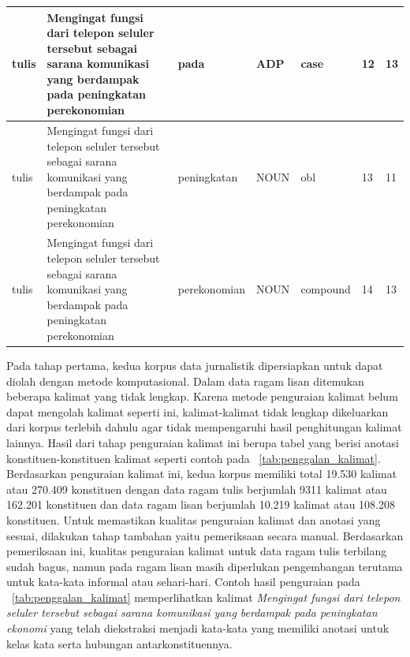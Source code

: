 \begin{center}
\begin{table}
\begin{tiny}
\begin{tabulary}{1\textwidth}{| L | L | L | L | L | L | L |}
tulis & Mengingat fungsi dari telepon seluler tersebut sebagai sarana komunikasi yang berdampak pada peningkatan perekonomian & pada & ADP & case & 12 & 13 \\ \hline
tulis & Mengingat fungsi dari telepon seluler tersebut sebagai sarana komunikasi yang berdampak pada peningkatan perekonomian & peningkatan & NOUN & obl & 13 & 11 \\ \hline
tulis & Mengingat fungsi dari telepon seluler tersebut sebagai sarana komunikasi yang berdampak pada peningkatan perekonomian & perekonomian & NOUN & compound & 14 & 13 \\ 
\hline
  \end{tabulary}  
\end{tiny}
\end{table}
\end{center}

Pada tahap pertama, kedua korpus data jurnalistik dipersiapkan untuk dapat diolah dengan metode komputasional. Dalam data ragam lisan ditemukan beberapa kalimat yang tidak lengkap. Karena metode penguraian kalimat belum dapat mengolah kalimat seperti ini, kalimat-kalimat tidak lengkap dikeluarkan dari korpus terlebih dahulu agar tidak mempengaruhi hasil penghitungan kalimat lainnya. Hasil dari tahap penguraian kalimat ini berupa tabel yang berisi anotasi konstituen-konstituen kalimat seperti contoh pada \tab~\ref{tab:penggalan_kalimat}. Berdasarkan penguraian kalimat ini, kedua korpus memiliki total 19.530 kalimat atau 270.409 konstituen dengan data ragam tulis berjumlah 9311 kalimat atau 162.201 konstituen dan data ragam lisan berjumlah 10.219 kalimat atau 108.208 konstituen. Untuk memastikan kualitas penguraian kalimat dan anotasi yang sesuai, dilakukan tahap tambahan yaitu pemeriksaan secara manual. Berdasarkan pemeriksaan ini, kualitas penguraian kalimat untuk data ragam tulis terbilang sudah bagus, namun pada ragam lisan masih diperlukan pengembangan terutama untuk kata-kata informal atau sehari-hari. Contoh hasil penguraian pada \tab~\ref{tab:penggalan_kalimat} memperlihatkan kalimat \textit{Mengingat fungsi dari telepon seluler tersebut sebagai sarana komunikasi yang berdampak pada peningkatan ekonomi} yang telah diekstraksi menjadi kata-kata yang memiliki anotasi untuk kelas kata serta hubungan antarkonstituennya. 

